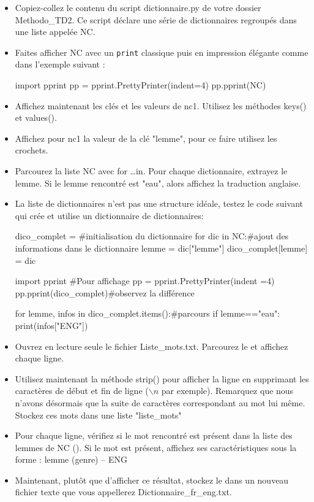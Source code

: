 \begin{itemize}
 \item Copiez-collez le contenu du script dictionnaire.py de votre dossier Methodo\_TD2. Ce script déclare une série de dictionnaires regroupés dans une liste appelée NC.
 \item Faites afficher NC avec un \texttt{print} classique puis en impression élégante comme dans l'exemple suivant :
\begin{python}
import pprint
pp = pprint.PrettyPrinter(indent=4)
pp.pprint(NC)
\end{python}
\item Affichez maintenant les clés et les valeurs de nc1. Utilisez les
méthodes keys() et values().
\item Affichez pour nc1 la valeur de la clé "lemme", pour ce faire utilisez les crochets.
 \item Parcourez la liste NC avec for \dots in. Pour chaque dictionnaire, extrayez le lemme. Si le lemme rencontré est "eau", alors affichez la traduction anglaise.
 \item La liste de dictionnaires n'est pas une structure idéale, testez le code suivant qui crée et utilise un dictionnaire de dictionnaires:
\begin{python}
dico_complet = {}#initialisation du dictionnaire
for dic in NC:#ajout des informations dans le dictionnaire
  lemme = dic["lemme"]
  dico_complet[lemme] = dic

import pprint #Pour affichage
pp = pprint.PrettyPrinter(indent =4)
pp.pprint(dico_complet)#observez la différence

for lemme, infos in dico_complet.items():#parcours
  if lemme=="eau":
    print(infos["ENG"])
\end{python}
 \item Ouvrez en lecture seule le fichier Liste\_mots.txt. Parcourez le et affichez chaque ligne.
\item Utilisez maintenant la méthode strip() pour afficher la ligne en supprimant les caractères de début et fin de ligne ($\backslash n$ par exemple). Remarquez que nous n'avons désormais que la suite de caractères correspondant au mot lui même. Stockez ces mots dans une liste "liste\_mots"
 \item Pour chaque ligne, vérifiez si le mot rencontré est présent dans la liste des lemmes de NC (). Si le mot est présent, affichez ses caractéristiques sous la forme : lemme (genre) -- ENG
\item Maintenant, plutôt que d'afficher ce résultat, stockez le dans un nouveau fichier texte que vous appellerez Dictionnaire\_fr\_eng.txt.
\end{itemize}

